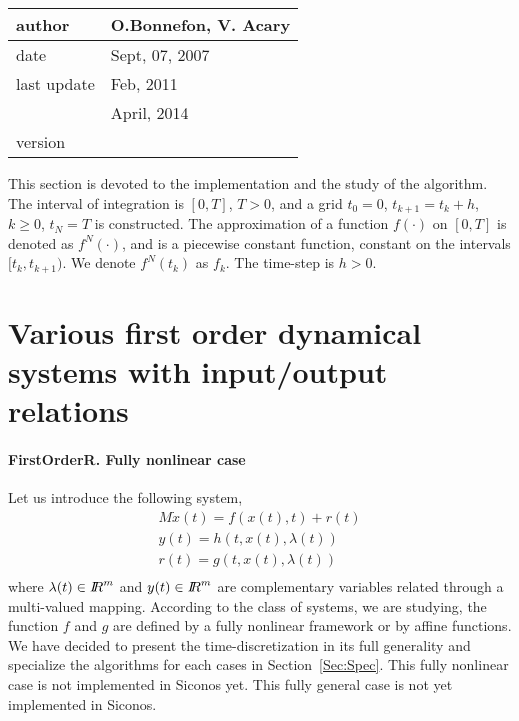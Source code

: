  \begin{table}[!ht]
  \begin{tabular}{|l|l|}
    \hline
    author  & O.Bonnefon, V. Acary\\
    \hline
    date    & Sept, 07, 2007 \\ 
    last update        & Feb, 2011 \\
                       & April, 2014 \\
    \hline
    version &  \\
    \hline
  \end{tabular}
\end{table}



This section is devoted to the implementation and the study  of the algorithm. The interval of integration is $[0,T]$, $T>0$, and a grid $t_{0}=0$, $t_{k+1}=t_{k}+h$, $k \geq 0$, $t_{N}=T$ is constructed. The approximation of a function $f(\cdot)$ on $[0,T]$ is denoted as $f^{N}(\cdot)$, and is a piecewise constant function, constant on the intervals $[t_{k},t_{k+1})$. We denote $f^{N}(t_{k})$ as $f_{k}$. The time-step is $h>0$. 


\section{Various first order dynamical systems with input/output relations}

\paragraph{FirstOrderR. Fully nonlinear case}
Let us introduce the following system, 
\begin{equation}
\begin{array}{l}
M \dot{x}(t) = f(x(t),t) + r(t)  \\[2mm]
y(t) = h(t,x(t),\lambda (t)) \\[2mm]
r(t) = g(t,x(t),\lambda (t) ) \\[2mm]
\end{array}
\label{first-DS}
\end{equation}
where $\lambda(t) \in \mbox{\rm $I\!\!R$}^m$  and $y(t) \in \mbox{\rm $I\!\!R$}^m$ are  complementary variables related through a multi-valued mapping.   According to the class of systems, we are studying, the function $f$ and $g$ are defined by a fully nonlinear framework or by affine functions. We have decided to present the time-discretization in its full generality and specialize the algorithms for each cases in Section~\ref{Sec:Spec}. This fully nonlinear case is not  implemented in Siconos yet. This fully general case is not yet implemented in Siconos.

